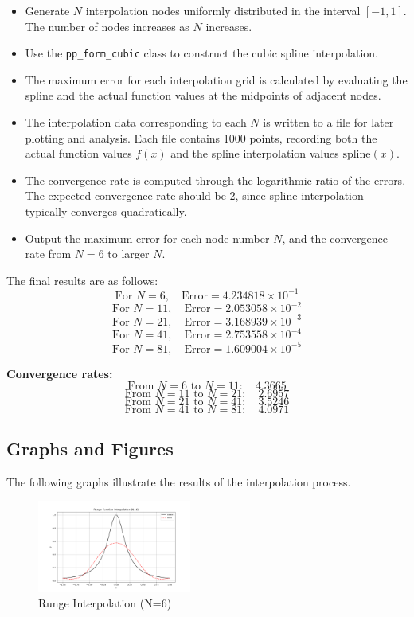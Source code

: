 \documentclass[a4paper]{article}
\begin{document}
\begin{itemize}
    \item Generate \( N \) interpolation nodes uniformly distributed in the interval \([-1, 1]\). The number of nodes increases as \( N \) increases.
    \item Use the \texttt{pp\_form\_cubic} class to construct the cubic spline interpolation.
    \item The maximum error for each interpolation grid is calculated by evaluating the spline and the actual function values at the midpoints of adjacent nodes.
    \item The interpolation data corresponding to each \( N \) is written to a file for later plotting and analysis. Each file contains 1000 points, recording both the actual function values \( f(x) \) and the spline interpolation values \( \text{spline}(x) \).
    \item The convergence rate is computed through the logarithmic ratio of the errors. The expected convergence rate should be 2, since spline interpolation typically converges quadratically.
    \item Output the maximum error for each node number \( N \), and the convergence rate from \( N = 6 \) to larger \( N \).
\end{itemize}

The final results are as follows:
\[
\text{For } N = 6, \quad \text{Error} = 4.234818 \times 10^{-1}
\]
\[
\text{For } N = 11, \quad \text{Error} = 2.053058 \times 10^{-2}
\]
\[
\text{For } N = 21, \quad \text{Error} = 3.168939 \times 10^{-3}
\]
\[
\text{For } N = 41, \quad \text{Error} = 2.753558 \times 10^{-4}
\]
\[
\text{For } N = 81, \quad \text{Error} = 1.609004 \times 10^{-5}
\]

\textbf{Convergence rates:}
\[
\text{From } N=6 \text{ to } N=11: \quad 4.3665
\]
\[
\text{From } N=11 \text{ to } N=21: \quad 2.6957
\]
\[
\text{From } N=21 \text{ to } N=41: \quad 3.5246
\]
\[
\text{From } N=41 \text{ to } N=81: \quad 4.0971
\]

\subsection*{Graphs and Figures}

The following graphs illustrate the results of the interpolation process.
\begin{figure}[H]
    \centering
    \includegraphics[width=0.45\textwidth]{figure/runge_interpolation_N6.png}
    \caption{Runge Interpolation (N=6)}
    \label{fig:runge_N6}
\end{figure}
\end{document}
